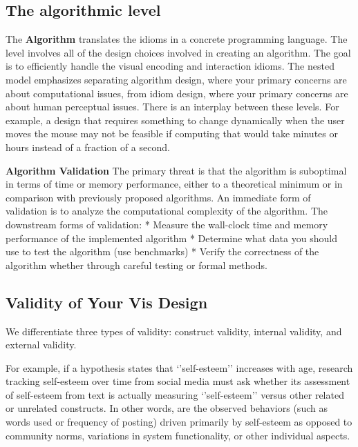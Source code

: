 \documentclass[
]{book}
\begin{document}
\hypertarget{the-algorithmic-level}{%
\subsection{The algorithmic level}\label{the-algorithmic-level}}

The \textbf{Algorithm} translates the idioms in a concrete programming language. The level involves all of the design choices involved in creating an algorithm. The goal is to efficiently handle the visual encoding and interaction idioms. The nested model emphasizes separating algorithm design, where your primary concerns are about computational issues, from idiom design, where your primary concerns are about human perceptual issues. There is an interplay between these levels. For example, a design that requires something to change dynamically when the user moves the mouse may not be feasible if computing that would take minutes or hours instead of a fraction of a second.

\textbf{Algorithm Validation} The primary threat is that the algorithm is suboptimal in terms of time or memory performance, either to a theoretical minimum or in comparison with previously proposed algorithms.
An immediate form of validation is to analyze the computational complexity of the algorithm.
The downstream forms of validation:
* Measure the wall-clock time and memory performance of the implemented algorithm
* Determine what data you should use to test the algorithm (use benchmarks)
* Verify the correctness of the algorithm whether through careful testing or formal methods.

\hypertarget{validity-of-your-vis-design}{%
\subsection{Validity of Your Vis Design}\label{validity-of-your-vis-design}}

We differentiate three types of validity: construct validity, internal validity, and external validity.

For example, if a hypothesis states that `'self-esteem'' increases with age, research tracking self-esteem over time from social media must ask whether its assessment of self-esteem from text is actually measuring `'self-esteem'' versus other related or unrelated constructs. In other words, are the observed behaviors (such as words used or frequency of posting) driven primarily by self-esteem as opposed to community norms, variations in system functionality, or other individual aspects.
\end{document}
